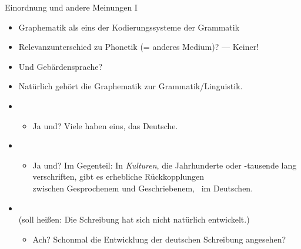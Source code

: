 \begin{frame}
  {Einordnung und andere Meinungen I}
  \pause
  \begin{itemize}[<+->]
    \item Graphematik als eins der \alert{Kodierungssysteme der Grammatik}
    \item Relevanzunterschied zu Phonetik (= anderes Medium)? --- \alert{Keiner!}
    \item Und \alert{Gebärdensprache}?
    \Halbzeile
    \item \alert{Natürlich gehört die Graphematik zur Grammatik\slash Linguistik.}
    \Halbzeile
    \item {}
      \begin{itemize}[<+->]
        \item \alert{Ja und? Viele haben eins, \zB das Deutsche.}
      \end{itemize}
      \Viertelzeile
    \item {}
      \begin{itemize}[<+->]
        \item \alert{Ja und? Im Gegenteil: In \textit{Kulturen}, die Jahrhunderte oder -tausende lang\\
        verschriften, gibt es erhebliche Rückkopplungen\\
        zwischen Gesprochenem und Geschriebenem, \zB\ im Deutschen.}
      \end{itemize}
      \Viertelzeile
    \item {}\\
      (soll heißen: Die Schreibung hat sich nicht natürlich entwickelt.)
      \begin{itemize}[<+->]
        \item \alert{Ach? Schonmal die Entwicklung der deutschen Schreibung angesehen?}
      \end{itemize}
  \end{itemize}
\end{frame}

